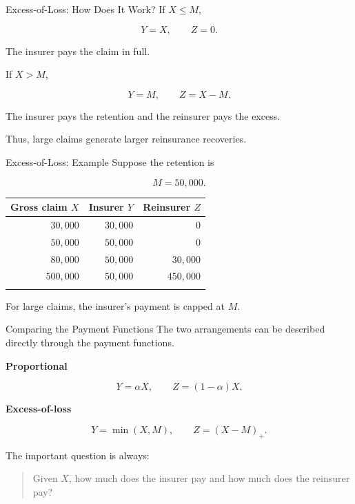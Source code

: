 \documentclass[
  ignorenonframetext,
  aspectratio=169,
]{beamer}
\newcounter{none} %
\begin{document}
\begin{frame}{Excess-of-Loss: How Does It Work?}
\protect{}\label{excess-of-loss-how-does-it-work}
If \(X\leq M\),

\[
Y=X,
\qquad
Z=0.
\]

The insurer pays the claim in full.

If \(X>M\),

\[
Y=M,
\qquad
Z=X-M.
\]

The insurer pays the retention and the reinsurer pays the excess.

Thus, large claims generate larger reinsurance recoveries.
\end{frame}

\begin{frame}{Excess-of-Loss: Example}
\protect{}\label{excess-of-loss-example}
Suppose the retention is

\[
M=50{,}000.
\]

{\def\LTcaptype{none} %
\begin{longtable}[]{@{}rrr@{}}
\toprule\noalign{}
Gross claim \(X\) & Insurer \(Y\) & Reinsurer \(Z\) \\
\midrule\noalign{}
\endhead
\(30{,}000\) & \(30{,}000\) & \(0\) \\
\(50{,}000\) & \(50{,}000\) & \(0\) \\
\(80{,}000\) & \(50{,}000\) & \(30{,}000\) \\
\(500{,}000\) & \(50{,}000\) & \(450{,}000\) \\
\bottomrule\noalign{}
\end{longtable}
}

For large claims, the insurer's payment is capped at \(M\).
\end{frame}

\begin{frame}{Comparing the Payment Functions}
\protect{}\label{comparing-the-payment-functions}
The two arrangements can be described directly through the payment
functions.

\textbf{Proportional}

\[
Y=\alpha X,
\qquad
Z=(1-\alpha)X.
\]

\textbf{Excess-of-loss}

\[
Y=\min(X,M),
\qquad
Z=(X-M)_+.
\]

The important question is always:

\begin{quote}
Given \(X\), how much does the insurer pay and how much does the
reinsurer pay?
\end{quote}
\end{frame}
\end{document}
